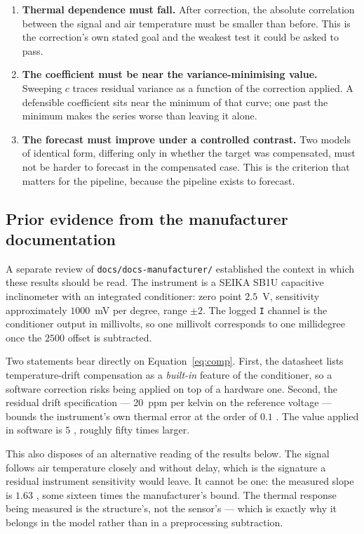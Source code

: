 \documentclass[11pt,a4paper]{article}
\begin{document}
\begin{enumerate}
\item \textbf{Thermal dependence must fall.} After correction, the absolute correlation
between the signal and air temperature must be smaller than before. This is the
correction's own stated goal and the weakest test it could be asked to pass.
\item \textbf{The coefficient must be near the variance-minimising value.} Sweeping $c$
traces residual variance as a function of the correction applied. A defensible
coefficient sits near the minimum of that curve; one past the minimum makes the series
worse than leaving it alone.
\item \textbf{The forecast must improve under a controlled contrast.} Two models of
identical form, differing only in whether the target was compensated, must not be
harder to forecast in the compensated case. This is the criterion that matters for the
pipeline, because the pipeline exists to forecast.
\end{enumerate}

\subsection{Prior evidence from the manufacturer documentation}
\label{sec:manufacturer}

A separate review of \texttt{docs/docs-manufacturer/} established the context in which
these results should be read. The instrument is a SEIKA SB1U capacitive inclinometer
with an integrated conditioner: zero point $2.5$~V, sensitivity approximately
$1000$~mV per degree, range $\pm 2$\textdegree. The logged \texttt{I} channel is the
conditioner output in millivolts, so one millivolt corresponds to one millidegree once
the $2500$ offset is subtracted.

Two statements bear directly on Equation~\eqref{eq:comp}. First, the datasheet lists
temperature-drift compensation as a \emph{built-in} feature of the conditioner, so a
software correction risks being applied on top of a hardware one. Second, the residual
drift specification --- 20~ppm per kelvin on the reference voltage --- bounds the
instrument's own thermal error at the order of $0.1$ \mdegC. The value applied in
software is $5$ \mdegC, roughly fifty times larger.

This also disposes of an alternative reading of the results below. The signal follows
air temperature closely and without delay, which is the signature a residual instrument
sensitivity would leave. It cannot be one: the measured slope is $1.63$ \mdegC, some
sixteen times the manufacturer's bound. The thermal response being measured is the
structure's, not the sensor's --- which is exactly why it belongs in the model rather
than in a preprocessing subtraction.
\end{document}
